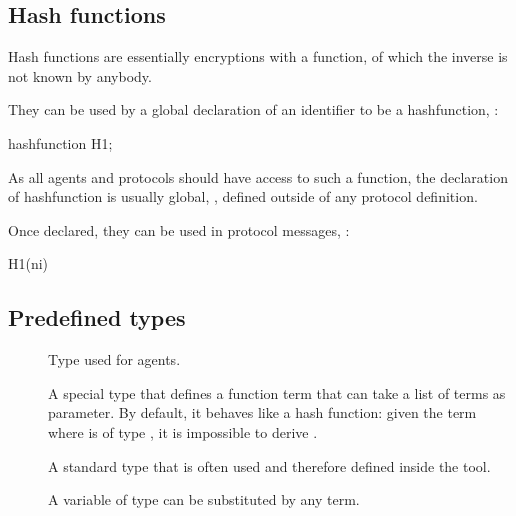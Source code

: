 \documentclass{book}
\begin{document}
\subsection{Hash functions}

Hash functions are essentially encryptions with a function, of which the inverse is not known by anybody.

They can be used by a global declaration of an identifier to be a
hashfunction, \eg:
\begin{spdl}
hashfunction H1;
\end{spdl}
As all agents and protocols should have access to such a function, the
declaration of hashfunction is usually global, \ie, defined outside of
any protocol definition.


\begin{example}
	Once declared, they can be used in protocol messages, \eg:
\begin{spdl}
H1(ni) 
\end{spdl}

\end{example}


\subsection{Predefined types}

\begin{description}

  \item []

  	Type used for agents.

  \item []

	A special type that defines a function term that can take a list
	of terms as parameter. By default, it behaves like a hash
	function: given the term  where  is of type
	, it is impossible to derive .

  \item []

  	A standard type that is often used and therefore defined inside
	the tool.

  \item []

	A variable of type  can be substituted by any term.

\end{description}
\end{document}
